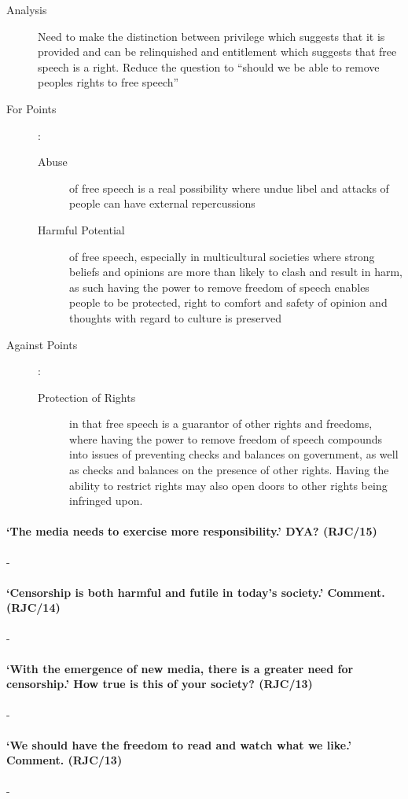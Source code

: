 \documentclass[../../main]{subfiles}
\begin{document}
\begin{description}
	\item[Analysis] Need to make the distinction between privilege which suggests that it is provided and can be relinquished and entitlement which suggests that free speech is a right. Reduce the question to ``should we be able to remove peoples rights to free speech''
	\item[For Points] :
		\begin{description}
			\item[Abuse] of free speech is a real possibility where undue libel and attacks of people can have external repercussions
			\item[Harmful Potential] of free speech, especially in multicultural societies where strong beliefs and opinions are more than likely to clash and result in harm, as such having the power to remove freedom of speech enables people to be protected, right to comfort and safety of opinion and thoughts with regard to culture is preserved
		\end{description}
	\item[Against Points]:
		\begin{description}
			\item[Protection of Rights] in that free speech is a guarantor of other rights and freedoms, where having the power to remove freedom of speech compounds into issues of preventing checks and balances on government, as well as checks and balances on the presence of other rights. Having the ability to restrict rights may also open doors to other rights being infringed upon.
		\end{description}
\end{description}

\paragraph{`The media needs to exercise more responsibility.' DYA? (RJC/15)}-

\paragraph{`Censorship is both harmful and futile in today's society.' Comment. (RJC/14)}-

\paragraph{`With the emergence of new media, there is a greater need for censorship.' How true is this of your society? (RJC/13)}-

\paragraph{`We should have the freedom to read and watch what we like.' Comment. (RJC/13)}-	
\end{document}
